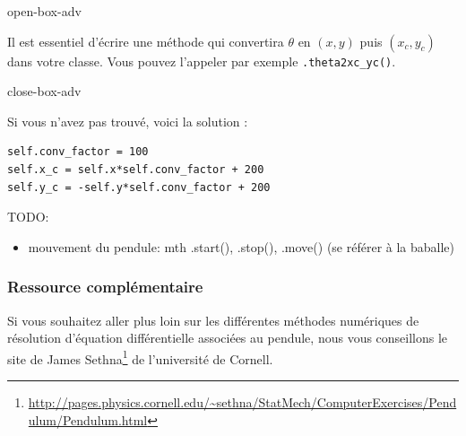 \documentclass[a4paper,11pt,twoside]{book}
\renewcommand{\href}[2]{#2\footnote{\url{#1}}}
\providecommand{\tightlist}{%
  \setlength{\itemsep}{0pt}\setlength{\parskip}{0pt}}
\begin{document}
open-box-adv

Il est essentiel d'écrire une méthode qui convertira \(\theta\) en
\((x, y)\) puis \((x_{c}, y_{c})\) dans votre classe. Vous pouvez
l'appeler par exemple \texttt{.theta2xc\_yc()}.

close-box-adv

Si vous n'avez pas trouvé, voici la solution :

\begin{verbatim}
self.conv_factor = 100
self.x_c = self.x*self.conv_factor + 200
self.y_c = -self.y*self.conv_factor + 200
\end{verbatim}

TODO:

\begin{itemize}
\tightlist
\item
  mouvement du pendule: mth .start(), .stop(), .move() (se référer à la
  baballe)
\end{itemize}

\subsubsection{Ressource
complémentaire}\label{ressource-compluxe9mentaire}

Si vous souhaitez aller plus loin sur les différentes méthodes
numériques de résolution d'équation différentielle associées au pendule,
nous vous conseillons le site de
\href{http://pages.physics.cornell.edu/~sethna/StatMech/ComputerExercises/Pendulum/Pendulum.html}{James
Sethna} de l'université de Cornell.
\end{document}
